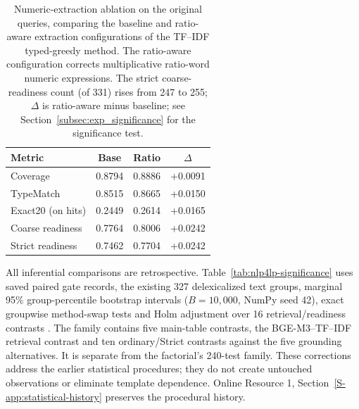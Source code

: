 \documentclass[pdflatex,iicol,sn-basic,Numbered]{sn-jnl}
\begin{document}
\begin{table}[t]
  \centering
  \renewcommand{\arraystretch}{1.18}
  \caption{Numeric-extraction ablation on the original queries, comparing the baseline and ratio-aware extraction configurations of the TF--IDF typed-greedy method. The ratio-aware configuration corrects multiplicative ratio-word numeric expressions. The strict coarse-readiness count (of 331) rises from 247 to 255; $\Delta$ is ratio-aware minus baseline; see Section~\ref{subsec:exp_significance} for the significance test.}
  \label{tab:nlp4lp-prefix-postfix}
  \small
  \setlength{\tabcolsep}{4pt}
  \begin{tabular}{lccc}
    \toprule
    Metric & Base & Ratio & $\Delta$ \\
    \midrule
Coverage & 0.8794 & 0.8886 & +0.0091 \\
TypeMatch & 0.8515 & 0.8665 & +0.0150 \\
Exact20 (on hits) & 0.2449 & 0.2614 & +0.0165 \\
Coarse readiness & 0.7764 & 0.8006 & +0.0242 \\
Strict readiness & 0.7462 & 0.7704 & +0.0242 \\
    \bottomrule
  \end{tabular}
\end{table}
All inferential comparisons are retrospective. Table~\ref{tab:nlp4lp-significance} uses saved paired gate records, the existing 327 delexicalized text groups, marginal 95\% group-percentile bootstrap intervals ($B=10{,}000$, NumPy seed 42), exact groupwise method-swap tests and Holm adjustment over 16 retrieval/readiness contrasts \cite{holm1979followup}. The family contains five main-table contrasts, the BGE-M3--TF--IDF retrieval contrast and ten ordinary/Strict contrasts against the five grounding alternatives. It is separate from the factorial's 240-test family. These corrections address the earlier statistical procedures; they do not create untouched observations or eliminate template dependence. Online Resource 1, Section~\ref{S-app:statistical-history} preserves the procedural history.
\end{document}

